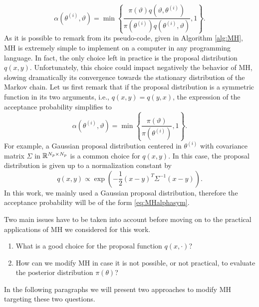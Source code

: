 \begin{equation}\label{eq:MHalpha}
	\alpha(\theta^{(i)}, \vartheta) = \min\left\{\frac{\pi(\vartheta)q(\vartheta, \theta^{(i)})}{\pi(\theta^{(i)})q(\theta^{(i)}, \vartheta)}, 1\right\}.
\end{equation}
As it is possible to remark from its pseudo-code, given in Algorithm \ref{alg:MH}, MH is extremely simple to implement on a computer in any programming language. In fact, the only choice left in practice is the proposal distribution $q(x,y)$. Unfortunately, this choice could impact negatively the behavior of MH, slowing dramatically its convergence towards the stationary distribution of the Markov chain. Let us first remark that if the proposal distribution is a symmetric function in its two arguments, i.e., $q(x, y) = q(y, x)$,  the expression of the acceptance probability simplifies to
\begin{equation}\label{eq:MHalphasym}
	\alpha(\theta^{(i)}, \vartheta) = \min\left\{\frac{\pi(\vartheta)}{\pi(\theta^{(i)})}, 1\right\}.
\end{equation}
For example, a Gaussian proposal distribution centered in $\theta^{(i)}$ with covariance matrix $\Sigma$ in $\mathbb{R}^{N_p\times N_p}$ is a common choice for $q(x, y)$. In this case, the proposal distribution is given up to a normalization constant by
\begin{equation}\label{eq:gaussianProp}
	q(x, y) \propto \exp(-\frac{1}{2}(x - y)^T\Sigma^{-1}(x - y)).
\end{equation}
In this work, we mainly used a Gaussian proposal distribution, therefore the acceptance probability will be of the form \eqref{eq:MHalphasym}. 

Two main issues have to be taken into account before moving on to the practical applications of MH we considered for this work.
\begin{enumerate}
	\item What is a good choice for the proposal function $q(x, \cdot)$?
	\item How can we modify MH in case it is not possible, or not practical, to evaluate the posterior distribution $\pi(\theta)$?
\end{enumerate}
In the following paragraphs we will present two approaches to modify MH targeting these two questions. 

